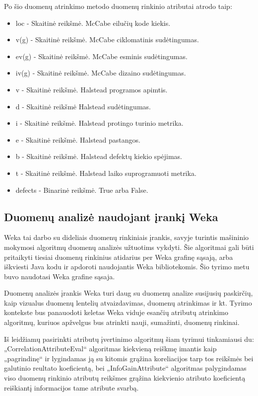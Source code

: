 \documentclass{VUMIFPSbakalaurinis}
\begin{document}
Po šio duomenų atrinkimo metodo duomenų rinkinio atributai atrodo taip:
\begin{itemize} 
\item[] loc - Skaitinė reikšmė. McCabe eilučių kode kiekis.
\item[] v(g) - Skaitinė reikšmė. McCabe ciklomatinis sudėtingumas.
\item[] ev(g) - Skaitinė reikšmė. McCabe esminis sudėtingumas.
\item[] iv(g) - Skaitinė reikšmė. McCabe dizaino sudėtingumas.
\item[] v - Skaitinė reikšmė. Halstead programos apimtis.
\item[] d - Skaitinė reikšmė Halstead sudėtingumas.
\item[] i - Skaitinė reikšmė. Halstead protingo turinio metrika.
\item[] e - Skaitinė reikšmė. Halstead pastangos.
\item[] b - Skaitinė reikšmė. Halstead defektų kiekio spėjimas.
\item[] t - Skaitinė reikšmė. Halstead laiko suprogramuoti metrika.
\item[] defects - Binarinė reikšmė. True arba False.
\end{itemize} 


\subsection{Duomenų analizė naudojant įrankį Weka}

Weka tai darbo su dideliais duomenų rinkiniais įrankis, savyje turintis mašininio mokymosi algoritmų duomenų analizės užtuotims vykdyti. Šie algoritmai gali būti pritaikyti tiesiai duomenų rinkinius atidarius per Weka grafinę sąsają, arba iškviesti Java kodu ir apdoroti naudojantis Weka bibliotekomis.  Šio tyrimo metu buvo naudotasi Weka grafine sąsaja.

Duomenų analizės įrankis Weka \cite{hall09:_weka_data_minin_softw} turi daug su duomenų analize susijusių paskirčių, kaip vizualus duomenų lentelių atvaizdavimas, duomenų atrinkimas ir kt. Tyrimo kontekste bus panauodoti keletas Weka viduje esančių atributų atrinkimo algoritmų, kuriuos apžvelgus bus atrinkti nauji, sumažinti, duomenų rinkinai.

Iš leidžiamų pasirinkti atributų įvertinimo algoritmų šiam tyrimui tinkamiausi du: „CorrelationAttributeEval“ algoritmas kiekvieną reiškmę imantis kaip „pagrindinę“ ir lygindamas ją su kitomis grąžina koreliacijos tarp tos reikšmės bei galutinio reultato koeficientą, bei „InfoGainAttribute“ algoritmas palygindamas viso duomenų rinkinio atributų reikšmes grąžina kiekvienio atributo koeficientą reiškiantį informacijos tame atribute svarbą.
\end{document}
